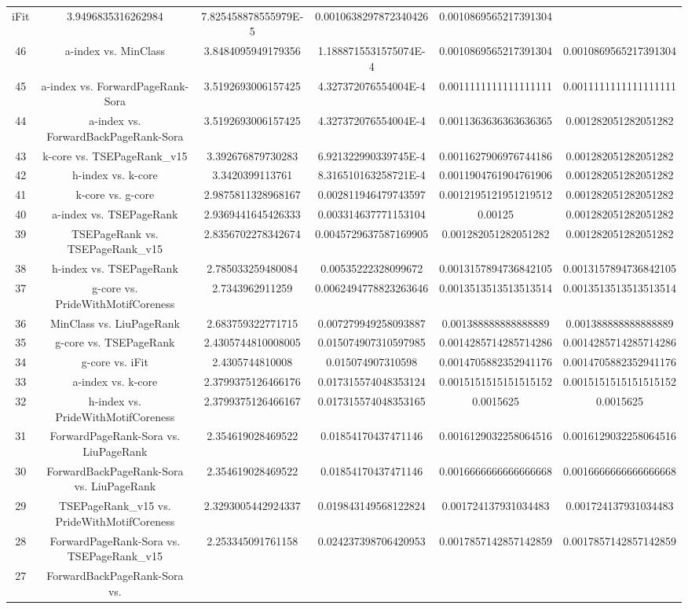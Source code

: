 \documentclass[a4paper,10pt]{article}
\begin{document}
\begin{landscape}
\begin{table}[!htp]
\begin{tabular}{cccccc}
iFit&3.9496835316262984&7.825458878555979E-5&0.0010638297872340426&0.0010869565217391304\\46&a-index vs. MinClass&3.8484095949179356&1.1888715531575074E-4&0.0010869565217391304&0.0010869565217391304\\45&a-index vs. ForwardPageRank-Sora&3.5192693006157425&4.327372076554004E-4&0.0011111111111111111&0.0011111111111111111\\44&a-index vs. ForwardBackPageRank-Sora&3.5192693006157425&4.327372076554004E-4&0.0011363636363636365&0.001282051282051282\\43&k-core vs. TSEPageRank_v15&3.392676879730283&6.921322990339745E-4&0.0011627906976744186&0.001282051282051282\\42&h-index vs. k-core&3.3420399113761&8.316510163258721E-4&0.0011904761904761906&0.001282051282051282\\41&k-core vs. g-core&2.9875811328968167&0.002811946479743597&0.0012195121951219512&0.001282051282051282\\40&a-index vs. TSEPageRank&2.9369441645426333&0.003314637771153104&0.00125&0.001282051282051282\\39&TSEPageRank vs. TSEPageRank_v15&2.8356702278342674&0.0045729637587169905&0.001282051282051282&0.001282051282051282\\38&h-index vs. TSEPageRank&2.785033259480084&0.00535222328099672&0.0013157894736842105&0.0013157894736842105\\37&g-core vs. PrideWithMotifCoreness&2.7343962911259&0.0062494778823263646&0.0013513513513513514&0.0013513513513513514\\36&MinClass vs. LiuPageRank&2.683759322771715&0.007279949258093887&0.001388888888888889&0.001388888888888889\\35&g-core vs. TSEPageRank&2.4305744810008005&0.015074907310597985&0.0014285714285714286&0.0014285714285714286\\34&g-core vs. iFit&2.4305744810008&0.015074907310598&0.0014705882352941176&0.0014705882352941176\\33&a-index vs. k-core&2.3799375126466176&0.017315574048353124&0.0015151515151515152&0.0015151515151515152\\32&h-index vs. PrideWithMotifCoreness&2.3799375126466167&0.017315574048353165&0.0015625&0.0015625\\31&ForwardPageRank-Sora vs. LiuPageRank&2.354619028469522&0.01854170437471146&0.0016129032258064516&0.0016129032258064516\\30&ForwardBackPageRank-Sora vs. LiuPageRank&2.354619028469522&0.01854170437471146&0.0016666666666666668&0.0016666666666666668\\29&TSEPageRank_v15 vs. PrideWithMotifCoreness&2.3293005442924337&0.019843149568122824&0.001724137931034483&0.001724137931034483\\28&ForwardPageRank-Sora vs. TSEPageRank_v15&2.253345091761158&0.024237398706420953&0.0017857142857142859&0.0017857142857142859\\27&ForwardBackPageRank-Sora vs. 
\end{tabular}
\end{table}
\end{landscape}
\end{document}
